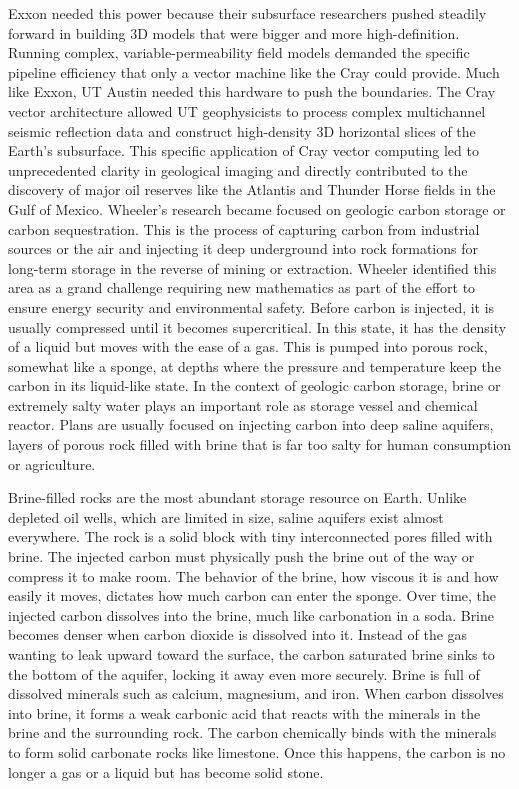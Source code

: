 Exxon needed this power because their subsurface researchers pushed steadily forward in building 3D models that were bigger and more high-definition. Running complex, variable-permeability field models demanded the specific pipeline efficiency that only a vector machine like the Cray could provide. Much like Exxon, UT Austin needed this hardware to push the boundaries. The Cray vector architecture allowed UT geophysicists to process complex multichannel seismic reflection data and construct high-density 3D horizontal slices of the Earth's subsurface. This specific application of Cray vector computing led to unprecedented clarity in geological imaging and directly contributed to the discovery of major oil reserves like the Atlantis and Thunder Horse fields in the Gulf of Mexico.
Wheeler’s research became focused on geologic carbon storage or carbon sequestration. This is the process of capturing carbon from industrial sources or the air and injecting it deep underground into rock formations for long-term storage in the reverse of mining or extraction. Wheeler identified this area as a grand challenge requiring new mathematics as part of the effort to ensure energy security and environmental safety. Before carbon is injected, it is usually compressed until it becomes supercritical. In this state, it has the density of a liquid but moves with the ease of a gas. This is pumped into porous rock, somewhat like a sponge, at depths where the pressure and temperature keep the carbon in its liquid-like state. In the context of geologic carbon storage, brine or extremely salty water plays an important role as storage vessel and  chemical reactor. Plans are usually focused on injecting carbon into deep saline aquifers, layers of porous rock filled with brine that is far too salty for human consumption or agriculture. 

Brine-filled rocks are the most abundant storage resource on Earth. Unlike depleted oil wells, which are limited in size, saline aquifers exist almost everywhere. The rock is a solid block with tiny interconnected pores filled with brine. The injected carbon must physically push the brine out of the way or compress it to make room. The behavior of the brine, how viscous it is and how easily it moves, dictates how much carbon can enter the sponge. Over time, the injected carbon dissolves into the brine, much like carbonation in a soda. Brine becomes denser when carbon dioxide is dissolved into it. Instead of the gas wanting to leak upward toward the surface, the carbon saturated brine sinks to the bottom of the aquifer, locking it away even more securely. Brine is full of dissolved minerals such as calcium, magnesium, and iron. When carbon dissolves into brine, it forms a weak carbonic acid that reacts with the minerals in the brine and the surrounding rock. The carbon chemically binds with the minerals to form solid carbonate rocks like limestone. Once this happens, the carbon is no longer a gas or a liquid but has become solid stone.

